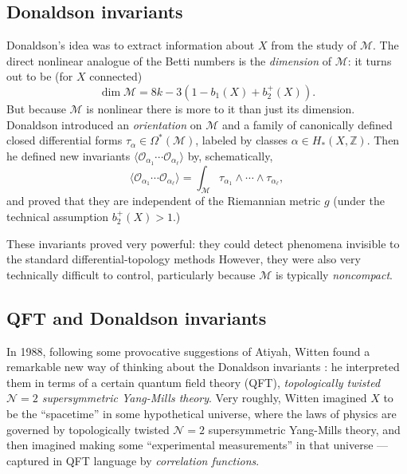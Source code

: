 \documentclass[12pt,letterpaper,reqno]{article}
\numberwithin{equation}{section}
\newcommand{\cM}{\ensuremath{\mathcal M}}
\newcommand{\cO}{\ensuremath{\mathcal O}}
\newcommand{\Z}{\ensuremath{\mathbb Z}}
\newcommand{\N}{{\mathcal N}}
\newcommand{\IP}[1]{\langle#1\rangle}
\newcommand{\ti}[1]{\textit{#1}}
\newcommand{\fixme}[1]{{\color{orange}{[#1]}}}
\begin{document}
\subsection{Donaldson invariants}

Donaldson's idea was to extract information about $X$ from
the study of $\cM$. The direct nonlinear analogue of the Betti numbers is the
\ti{dimension} of $\cM$: it turns out to be (for $X$ connected)
\begin{equation}
  \dim \cM = 8k - 3 (1 - b_1(X) + b_2^+(X)).
\end{equation}
But because $\cM$ is nonlinear there is more to it than just its dimension.
Donaldson introduced an \ti{orientation} on $\cM$
and a family of canonically defined
closed differential forms $\tau_\alpha \in \Omega^*(\cM)$,
labeled by classes $\alpha \in H_*(X,\Z)$.
Then he defined new invariants $\IP{\cO_{\alpha_1} \cdots \cO_{\alpha_\ell}}$
by, schematically,
\begin{equation} \label{eq:donaldson-integral}
  \IP{\cO_{\alpha_1} \cdots \cO_{\alpha_\ell}} = \int_\cM \tau_{\alpha_1} \wedge \cdots \wedge \tau_{\alpha_\ell},
\end{equation}
and proved that they are independent of the Riemannian metric
$g$ (under the technical
assumption $b_2^+(X) > 1$.)

These invariants proved very powerful: they could detect phenomena invisible to 
the standard differential-topology methods \fixme{explain something proved using them?} 
However, they were also very technically
difficult to control, particularly because $\cM$ is typically
\ti{noncompact}.


\subsection{QFT and Donaldson invariants}

In 1988, following some provocative suggestions of Atiyah,
Witten found a remarkable new way of thinking about
the Donaldson invariants \cite{Witten:1988ze}: he interpreted them
in terms of a certain quantum field theory (QFT),
\ti{topologically twisted $\N=2$ supersymmetric Yang-Mills theory}.
Very roughly, Witten imagined $X$ to be the ``spacetime''
in some hypothetical universe, where the laws of physics are governed
by topologically twisted $\N=2$ supersymmetric Yang-Mills theory,
and then imagined
making some ``experimental measurements'' in that universe --- captured
in QFT language by \ti{correlation functions}.
\end{document}
